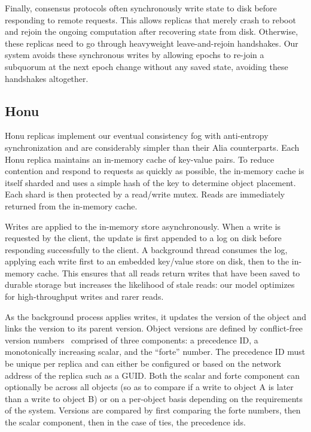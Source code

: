Finally, consensus protocols often synchronously write state to disk before responding to remote requests.
This allows replicas that merely crash to reboot and rejoin the ongoing computation after recovering state from disk.
Otherwise, these replicas need to go through heavyweight leave-and-rejoin handshakes.
Our system avoids these synchronous writes by allowing epochs to re-join a subquorum at the next epoch change without any saved state, avoiding these handshakes altogether.

\subsection{Honu}
\label{ch05_honu}

Honu replicas implement our eventual consistency fog with anti-entropy synchronization and are considerably simpler than their Alia counterparts.
Each Honu replica maintains an in-memory cache of key-value pairs.
To reduce contention and respond to requests as quickly as possible, the in-memory cache is itself sharded and uses a simple hash of the key to determine object placement.
Each shard is then protected by a read/write mutex.
Reads are immediately returned from the in-memory cache.

Writes are applied to the in-memory store asynchronously.
When a write is requested by the client, the update is first appended to a log on disk before responding successfully to the client.
A background thread consumes the log, applying each write first to an embedded key/value store on disk, then to the in-memory cache.
This ensures that all reads return writes that have been saved to durable storage but increases the likelihood of stale reads: our model optimizes for high-throughput writes and rarer reads.

As the background process applies writes, it updates the version of the object and links the version to its parent version.
Object versions are defined by conflict-free version numbers~\cite{version_conflict_detection,version_vectors} comprised of three components: a precedence ID, a monotonically increasing scalar, and the ``forte'' number.
The precedence ID must be unique per replica and can either be configured or based on the network address of the replica such as a GUID.
Both the scalar and forte component can optionally be across all objects (so as to compare if a write to object A is later than a write to object B) or on a per-object basis depending on the requirements of the system.
Versions are compared by first comparing the forte numbers, then the scalar component, then in the case of ties, the precedence ids.

